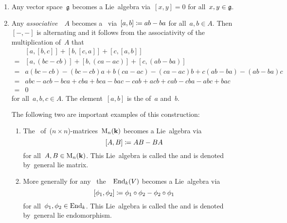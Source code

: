\begin{examples}
  \leavevmode
  \begin{enumerate}
    \item
      Any vector space~$\mathfrak{g}$ becomes a Lie~algebra via~$[x,y] = 0$ for all~$x,y \in \mathfrak{g}$.
    \item
      Any \emph{associative}~{\algebra{$\kf$}}~$A$ becomes a~{\liealgebra{$\kf$}} via~$[a,b] \coloneqq ab - ba$ for all~$a, b \in A$.
      Then~$[-, -]$ is alternating and it follows from the associativity of the multiplication of~$A$ that
      \begin{align*}
         {}&  [a,[b,c]] + [b,[c,a]] + [c,[a,b]] \\
        ={}&  [a, (bc-cb)] + [b, (ca-ac)] + [c, (ab-ba)] \\
        ={}&  a(bc-cb)-(bc-cb)a + b(ca-ac) - (ca-ac)b + c(ab-ba) - (ab-ba)c \\
        ={}&  abc - acb - bca + cba + bca - bac - cab + acb + cab - cba - abc + bac \\
        ={}&  0
    \end{align*}
    for all~$a, b, c \in A$.
    The element~$[a,b]$ is the  of~$a$ and~$b$.
   
    The following two are important examples of this construction:
    \begin{enumerate}
      \item
        The~{\algebra{$\kf$}} of~($n \times n$)-matrices~$\operatorname{M}_n(\mathbf{k})$ becomes a Lie~algebra via
        \[
          [A,B]
          \coloneqq
          AB - BA
        \]
        for all~$A, B \in \operatorname{M}_n(\mathbf{k})$.
        This Lie~algebra is called the  and is denoted by~\gls*{general lie matrix}.
      \item
        More generally for any~{\vectorspace{$\kf$}} the~{\algebra{$\kf$}}~$\operatorname{End}_k(V)$ becomes a Lie~algebra via
        \[
          [\phi_1, \phi_2]
          \coloneqq
          \phi_1 \circ \phi_2 - \phi_2 \circ \phi_1
        \]
        for all~$\phi_1, \phi_2 \in \operatorname{End}_k$.
        This Lie~algebra is called the  and is denoted by~\gls*{general lie endomorphism}.
    \end{enumerate}
  \end{enumerate}
\end{examples}


